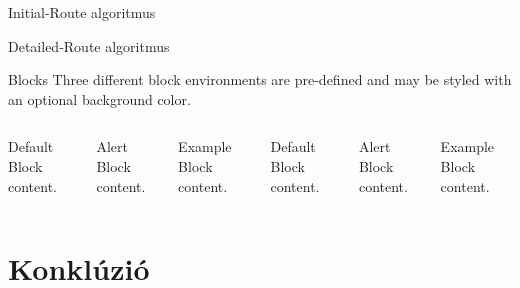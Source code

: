 \documentclass[10pt]{beamer}
\begin{document}
\begin{frame}{Initial-Route algoritmus}
\end{frame}

\begin{frame}{Detailed-Route algoritmus}
\end{frame}

\begin{frame}{Blocks}
  Three different block environments are pre-defined and may be styled with an
  optional background color.

  \begin{columns}[T,onlytextwidth]
      \begin{block}{Default}
        Block content.
      \end{block}

      \begin{alertblock}{Alert}
        Block content.
      \end{alertblock}

      \begin{exampleblock}{Example}
        Block content.
      \end{exampleblock}



      \begin{block}{Default}
        Block content.
      \end{block}

      \begin{alertblock}{Alert}
        Block content.
      \end{alertblock}

      \begin{exampleblock}{Example}
        Block content.
      \end{exampleblock}

  \end{columns}
\end{frame}

\section{Konklúzió}
\end{document}
